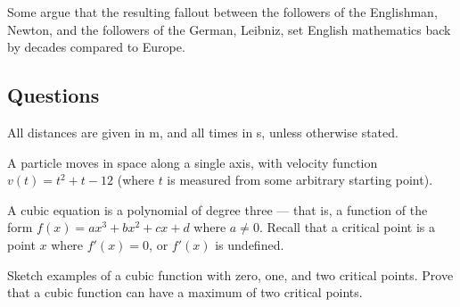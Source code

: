 Some argue that the resulting fallout between the followers of the Englishman, Newton, and the followers
of the German, Leibniz, set English mathematics back by decades compared to Europe.

\clearpage
\subsection*{Questions}
All distances are given in \si{\metre}, and all times in \si{\second}, unless otherwise stated.
\begin{questions}
  \question A particle moves in space along a single axis, with velocity function $ v(t) = t^2 + t - 12 $ (where $ t $ is measured from some
            arbitrary starting point).
  \question A cubic equation is a polynomial of degree three --- that is, a function
            of the form $ f(x) = ax^3 + bx^2 + cx + d $ where $ a \neq 0 $. Recall that
            a critical point is a point $ x $ where $ f'(x) = 0 $, or $ f'(x) $ is undefined.
            \begin{subparts}
              \subpart Sketch examples of a cubic function with zero, one, and two critical points.
              \subpart Prove that a cubic function can have a maximum of two critical points.
            \end{subparts}

\end{questions}


